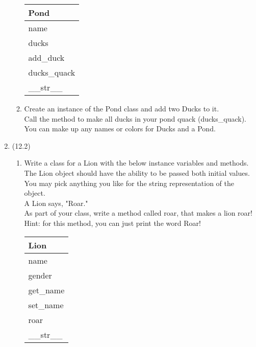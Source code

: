 \documentclass{article}
\begin{document}
\begin{enumerate}
\begin{enumerate}
			\begin{flushright}
			\begin{tabular}{|l|}
				\hline
				Pond\\ \hline  	%
				name\\ ducks\\ \hline		%
				add\_duck\\ ducks\_quack \\ \_\_str\_\_ \\ \hline		%
			\end{tabular}
			\end{flushright}

		\item
			Create an instance of the Pond class and add two Ducks to it.\\
			Call the method to make all ducks in your pond quack (ducks\_quack).\\
			You can make up any names or colors for Ducks and a Pond.\\
	\end{enumerate}
\pagebreak



\item (12.2)
	\begin{enumerate}
		\item
			Write a class for a Lion with the below instance variables and methods.\\ 
			The Lion object should have the ability to be passed both initial values.\\  
			You may pick anything you like for the string representation of the object.\\
			A Lion says, "Roar."\\  
			As part of your class, write a method called roar, that makes a lion roar!\\
			Hint: for this method, you can just print the word Roar!
			\begin{flushright}
			\begin{tabular}{|l|}
				\hline
				Lion\\ \hline
				name\\	gender\\	 \hline
				get\_name \\ set\_name \\ roar \\ \_\_str\_\_ \\ \hline
			\end{tabular}
			\end{flushright}


\end{enumerate}
\end{enumerate}
\end{document}
